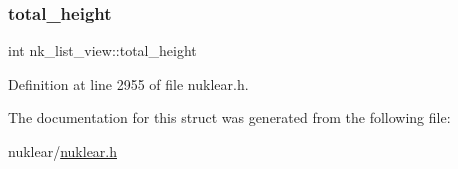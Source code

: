 \subsubsection{\texorpdfstring{total\+\_\+height}{total\_height}}
{\footnotesize\ttfamily int nk\+\_\+list\+\_\+view\+::total\+\_\+height}



Definition at line 2955 of file nuklear.\+h.



The documentation for this struct was generated from the following file\+:\begin{DoxyCompactItemize}
\item 
nuklear/\mbox{\hyperlink{nuklear_8h}{nuklear.\+h}}\end{DoxyCompactItemize}
